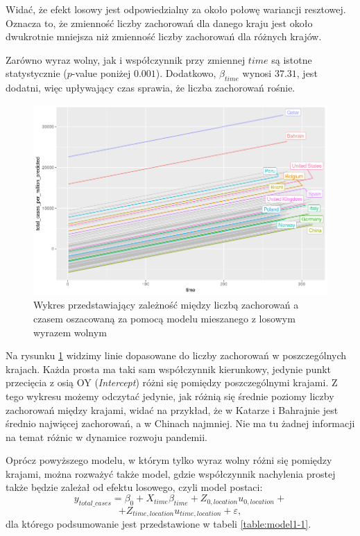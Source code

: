 \documentclass[12pt]{mwbk}
\theoremstyle{plain}
\theoremstyle{definition}
\theoremstyle{definition}
\newcommand\zrodlo[1]{\par\vspace{-3mm}{\small\textit{Źródło: }#1 }}
\begin{document}
Widać, że efekt losowy jest odpowiedzialny za około połowę wariancji resztowej. Oznacza to, że zmienność liczby zachorowań dla danego kraju jest około dwukrotnie mniejsza niż zmienność liczby zachorowań dla różnych krajów.



Zarówno wyraz wolny, jak i współczynnik przy zmiennej $time$ są istotne statystycznie ($p$-value poniżej $0.001$). Dodatkowo, $\beta_{time}$ wynosi $37.31$, jest dodatni, więc upływający czas sprawia, że liczba zachorowań rośnie.



\begin{figure}[!ht]
	\centering
	\includegraphics[width=\linewidth]{rys/mod1_predict.png}
	\caption{Wykres przedstawiający zależność między liczbą zachorowań a czasem oszacowaną za pomocą modelu mieszanego z losowym wyrazem wolnym}
	\label{fig:mod1_predict}
	\zrodlo{Opracowanie własne}
\end{figure}

Na rysunku \ref{fig:mod1_predict} widzimy linie dopasowane do liczby zachorowań w poszczególnych krajach. Każda prosta ma taki sam współczynnik kierunkowy, jedynie punkt przecięcia z osią OY (\textit{Intercept}) różni się pomiędzy poszczególnymi krajami. Z tego wykresu możemy odczytać jedynie, jak różnią się średnie poziomy liczby zachorowań między krajami, widać na przykład, że w Katarze i Bahrajnie jest średnio najwięcej zachorowań, a w Chinach najmniej. Nie ma tu żadnej informacji na temat różnic w dynamice rozwoju pandemii.



Oprócz powyższego modelu, w którym tylko wyraz wolny różni się pomiędzy krajami, można rozważyć także model, gdzie współczynnik nachylenia prostej także będzie zależał od efektu losowego, czyli model postaci:
$$y_{total\_cases}=\beta_0+X_{time}\beta_{time}+Z_{0,location}u_{0,location}+$$$$+Z_{time,location}u_{time,location}+\varepsilon,$$
dla którego podsumowanie jest przedstawione w tabeli \ref{table:model1-1}.
\end{document}
